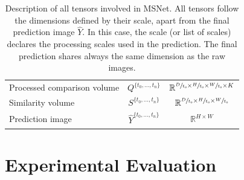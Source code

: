 \documentclass[runningheads]{llncs}
\begin{document}
\begin{table}[t]
\begin{tabular}{ l|c|c }
    Processed comparison volume & $Q^{ \{ t_0, ... , t_n \} }$ & $ \mathbb{R}^{ \sfrac{D}{t_0} \times \sfrac{H}{t_0} \times \sfrac{W}{t_0} \times K }  $ \rule{0pt}{3ex} \\
    
    Similarity volume & $S^{ \{ t_0, ... , t_n \} }$ & $ \mathbb{R}^{ \sfrac{D}{t_0} \times \sfrac{H}{t_0} \times \sfrac{W}{t_0}} $ \rule{0pt}{3.5ex} \\
    
    Prediction image & $\hat{Y}^{ \{ t_0, ... , t_n \} }$ & $\mathbb{R}^{ H \times W}$ \rule{0pt}{3.5ex} \\
    \hline
    \end{tabular}
    \caption{Description of all tensors involved in MSNet. All tensors follow the dimensions defined by their scale, apart from the final prediction image $\hat{Y}$. In this case, the scale (or list of scales) declares the processing scales used in the prediction. The final prediction shares always the same dimension as the raw images.}
    \label{tab:entity_description}
\end{table}

\section{Experimental Evaluation}
\end{document}
